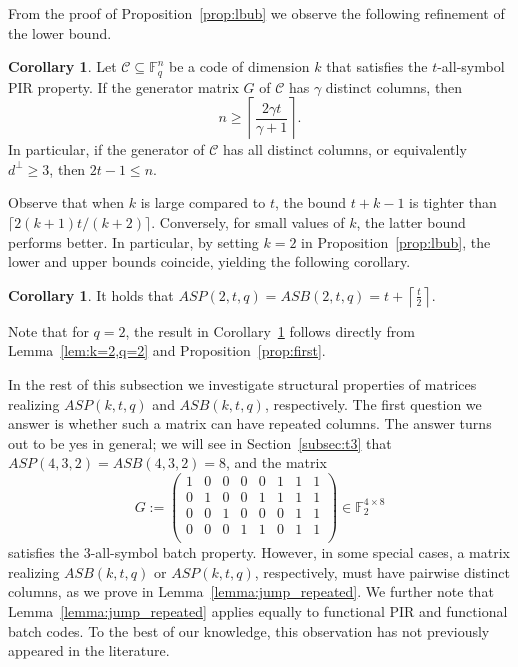\documentclass[11pt,a4paper]{article}
\theoremstyle{definition}
\newtheorem{corollary}[theorem]{Corollary}
\newcommand{\F}{\mathbb{F}}
\newcommand{\mC}{\mathcal{C}}
\begin{document}
From the proof of Proposition~\ref{prop:lbub} we observe the following refinement of the lower bound.

\begin{corollary}
    Let $\mathcal{C} \subseteq \F_q^n$ be a code of dimension $k$ that satisfies the $t$-all-symbol PIR property. If the generator matrix $G$ of $\mC$ has $\gamma$ distinct columns, then
    $$
        n\geq \left\lceil \frac{2\gamma t}{\gamma+1}\right\rceil.
    $$ In particular, if the generator of $\mathcal{C}$ has all distinct columns, or equivalently $d^\perp \ge 3$, then $2t-1 \le n$.
\end{corollary}

Observe that when $k$ is large compared to $t$, the bound 
$t + k - 1$ is tighter than $\lceil {2(k+1)t}/{(k+2)}\rceil$. 
Conversely, for small values of $k$, the latter bound performs better. In particular, by setting $k=2$ in 
Proposition~\ref{prop:lbub}, the lower and upper bounds 
coincide, yielding the following corollary.

\begin{corollary}\label{prop:k=2}
    It holds that $ASP(2,t,q) = ASB(2,t,q) = t+\left\lceil\frac{t}{2}\right\rceil.$
\end{corollary}

Note that for $q = 2$, the result in 
Corollary~\ref{prop:k=2} follows directly from  Lemma~\ref{lem:k=2,q=2} and 
Proposition~\ref{prop:first}.

In the rest of this subsection we investigate structural properties of matrices realizing $ASP(k,t,q)$ and $ASB(k,t,q)$, respectively. The first question we answer is whether such a matrix can have repeated columns. The answer turns out to be yes in general; we will see in Section~\ref{subsec:t3} that $ASP(4,3,2)=ASB(4,3,2) = 8$, and the matrix
    $$
        G :=
        \begin{pmatrix}
            1 & 0 & 0 & 0 & 0 & 1 & 1 & 1 \\
            0 & 1 & 0 & 0 & 1 & 1 & 1 & 1 \\
            0 & 0 & 1 & 0 & 0 & 0 & 1 & 1 \\
            0 & 0 & 0 & 1 & 1 & 0 & 1 & 1 \\
        \end{pmatrix} \in \F_2^{4 \times 8}
    $$
satisfies the 3-all-symbol batch property. However, in some special cases, a matrix realizing $ASB(k,t,q)$ or $ASP(k,t,q)$, respectively, must have pairwise distinct columns, as we prove in Lemma~\ref{lemma:jump_repeated}. We further note that Lemma~\ref{lemma:jump_repeated} applies equally to functional PIR and functional batch codes. To the best of our knowledge, this observation has not previously appeared in the literature.
\end{document}
